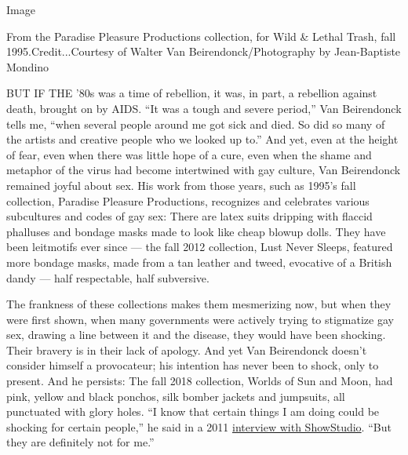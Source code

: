Image

From the Paradise Pleasure Productions collection, for Wild \& Lethal
Trash, fall 1995.Credit...Courtesy of Walter Van Beirendonck/Photography
by Jean-Baptiste Mondino

BUT IF THE '80s was a time of rebellion, it was, in part, a rebellion
against death, brought on by AIDS. ``It was a tough and severe period,''
Van Beirendonck tells me, ``when several people around me got sick and
died. So did so many of the artists and creative people who we looked up
to.'' And yet, even at the height of fear, even when there was little
hope of a cure, even when the shame and metaphor of the virus had become
intertwined with gay culture, Van Beirendonck remained joyful about sex.
His work from those years, such as 1995's fall collection, Paradise
Pleasure Productions, recognizes and celebrates various subcultures and
codes of gay sex: There are latex suits dripping with flaccid phalluses
and bondage masks made to look like cheap blowup dolls. They have been
leitmotifs ever since --- the fall 2012 collection, Lust Never Sleeps,
featured more bondage masks, made from a tan leather and tweed,
evocative of a British dandy --- half respectable, half subversive.

The frankness of these collections makes them mesmerizing now, but when
they were first shown, when many governments were actively trying to
stigmatize gay sex, drawing a line between it and the disease, they
would have been shocking. Their bravery is in their lack of apology. And
yet Van Beirendonck doesn't consider himself a provocateur; his
intention has never been to shock, only to present. And he persists: The
fall 2018 collection, Worlds of Sun and Moon, had pink, yellow and black
ponchos, silk bomber jackets and jumpsuits, all punctuated with glory
holes. ``I know that certain things I am doing could be shocking for
certain people,'' he said in a 2011
\href{https://www.showstudio.com/projects/in_fashion/walter-van-beirendonck}{interview
with ShowStudio}. ``But they are definitely not for me.''

